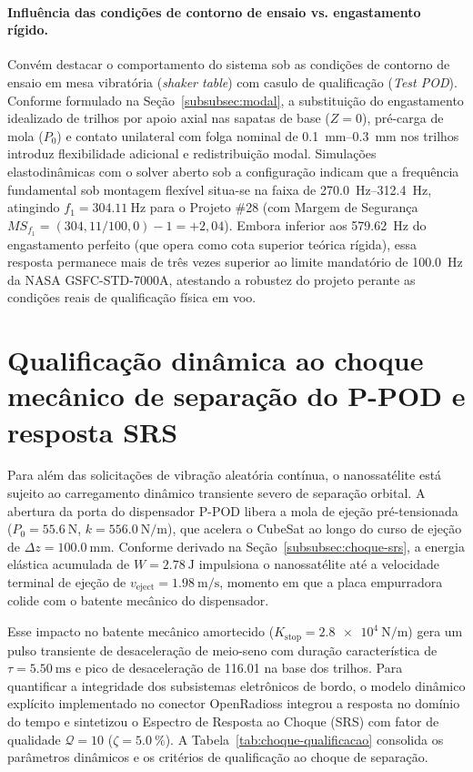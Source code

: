 \paragraph{Influência das condições de contorno de ensaio vs. engastamento rígido.}
Convém destacar o comportamento do sistema sob as condições de contorno de ensaio em mesa vibratória (\textit{shaker table}) com casulo de qualificação (\textit{Test POD}). Conforme formulado na Seção~\ref{subsubsec:modal}, a substituição do engastamento idealizado de trilhos por apoio axial nas sapatas de base ($Z = 0$), pré-carga de mola ($P_0$) e contato unilateral com folga nominal de \SIrange{0.1}{0.3}{\milli\metre} nos trilhos introduz flexibilidade adicional e redistribuição modal. Simulações elastodinâmicas com o solver aberto sob a configuração  indicam que a frequência fundamental sob montagem flexível situa-se na faixa de \SIrange{270.0}{312.4}{\hertz}, atingindo $f_1 = \SI{304.11}{\hertz}$ para o Projeto \#28 (com Margem de Segurança $MS_{f_1} = (304{,}11 / 100{,}0) - 1 = +2{,}04$). Embora inferior aos \SI{579.62}{\hertz} do engastamento perfeito (que opera como cota superior teórica rígida), essa resposta permanece mais de três vezes superior ao limite mandatório de \SI{100.0}{\hertz} da NASA GSFC-STD-7000A, atestando a robustez do projeto perante as condições reais de qualificação física em voo.

\section{Qualificação dinâmica ao choque mecânico de separação do P-POD e resposta SRS}
\label{sec:choque-srs}

Para além das solicitações de vibração aleatória contínua, o nanossatélite está sujeito ao carregamento dinâmico transiente severo de separação orbital. A abertura da porta do dispensador P-POD libera a mola de ejeção pré-tensionada ($P_0 = \SI{55.6}{\newton}$, $k = \SI{556.0}{\newton\per\metre}$), que acelera o CubeSat ao longo do curso de ejeção de $\Delta z = \SI{100.0}{\milli\metre}$. Conforme derivado na Seção~\ref{subsubsec:choque-srs}, a energia elástica acumulada de $W = \SI{2.78}{\joule}$ impulsiona o nanossatélite até a velocidade terminal de ejeção de $v_{\text{eject}} = \SI{1.98}{\metre\per\second}$, momento em que a placa empurradora colide com o batente mecânico do dispensador.

Esse impacto no batente mecânico amortecido ($K_{\text{stop}} = \SI{2.8e4}{\newton\per\metre}$) gera um pulso transiente de desaceleração de meio-seno com duração característica de $\tau = \SI{5.50}{\milli\second}$ e pico de desaceleração de \SI{116.01}{\gravity} na base dos trilhos. Para quantificar a integridade dos subsistemas eletrônicos de bordo, o modelo dinâmico explícito implementado no conector OpenRadioss integrou a resposta no domínio do tempo e sintetizou o Espectro de Resposta ao Choque (SRS) com fator de qualidade $\mathcal{Q} = 10$ ($\zeta = \SI{5.0}{\percent}$). A Tabela~\ref{tab:choque-qualificacao} consolida os parâmetros dinâmicos e os critérios de qualificação ao choque de separação.

